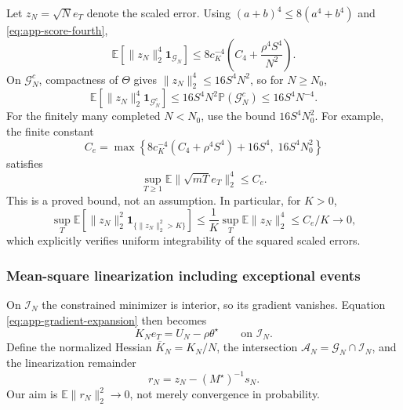 \documentclass[10pt,twoside,letterpaper]{article}
\newcommand{\E}{\mathbb E}
\newcommand{\Prob}{\mathbb P}
\newcommand{\norm}[1]{\lVert #1\rVert}
\begin{document}
Let $z_N=\sqrt N e_T$ denote the scaled error. Using
$(a+b)^4\le8(a^4+b^4)$ and \eqref{eq:app-score-fourth},
\begin{equation}
\E[\norm{z_N}_2^4\mathbf1_{\mathcal G_N}]
\le8c_K^{-4}\left(C_4+\frac{\rho^4S^4}{N^2}\right).
\label{eq:app-good-estimator-fourth}
\end{equation}
On $\mathcal G_N^c$, compactness of $\Theta$ gives
$\norm{z_N}_2^4\le16S^4N^2$, so for $N\ge N_0$,
\begin{equation}
\E[\norm{z_N}_2^4\mathbf1_{\mathcal G_N^c}]
\le16S^4N^2\Prob(\mathcal G_N^c)
\le16S^4N^{-4}.
\label{eq:app-bad-estimator-fourth}
\end{equation}
For the finitely many completed $N<N_0$, use the bound
$16S^4N_0^2$. For example, the finite constant
\begin{equation}
C_e=\max\left\{
8c_K^{-4}(C_4+\rho^4S^4)+16S^4,\;16S^4N_0^2\right\}
\label{eq:app-estimator-moment-constant}
\end{equation}
satisfies
\begin{equation}
\sup_{T\ge1}\E\norm{\sqrt{mT}e_T}_2^4\le C_e.
\label{eq:app-estimator-fourth}
\end{equation}
This is a proved bound, not an assumption. In particular, for $K>0$,
\begin{equation}
\sup_T\E\!\left[\norm{z_N}_2^2
\mathbf1_{\{\norm{z_N}_2^2>K\}}\right]
\le\frac1K\sup_T\E\norm{z_N}_2^4\le C_e/K\to0,
\label{eq:app-uniform-integrability}
\end{equation}
which explicitly verifies uniform integrability of the squared
scaled errors.

\subsubsection{Mean-square linearization including exceptional events}

On $\mathcal I_N$ the constrained minimizer is interior, so its gradient
vanishes. Equation \eqref{eq:app-gradient-expansion} then becomes
\begin{equation}
K_Ne_T=U_N-\rho\theta^\star
\qquad\text{on }\mathcal I_N.
\label{eq:app-interior-score}
\end{equation}
Define the normalized Hessian $\overline K_N=K_N/N$, the intersection
$\mathcal A_N=\mathcal G_N\cap\mathcal I_N$, and the linearization
remainder
\begin{equation}
r_N=z_N-(M^\star)^{-1}s_N.
\label{eq:app-remainder-definition}
\end{equation}
Our aim is $\E\norm{r_N}_2^2\to0$, not merely convergence in
probability.
\end{document}
